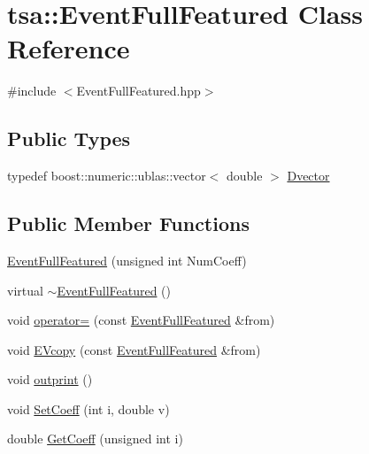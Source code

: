 \hypertarget{classtsa_1_1_event_full_featured}{}\section{tsa\+:\+:Event\+Full\+Featured Class Reference}
\label{classtsa_1_1_event_full_featured}


{\ttfamily \#include $<$Event\+Full\+Featured.\+hpp$>$}

\subsection*{Public Types}
\begin{DoxyCompactItemize}
\item 
typedef boost\+::numeric\+::ublas\+::vector$<$ double $>$ \hyperlink{classtsa_1_1_event_full_featured_a6488de4b125cea43e4528244e3300ace}{Dvector}
\end{DoxyCompactItemize}
\subsection*{Public Member Functions}
\begin{DoxyCompactItemize}
\item 
\hyperlink{classtsa_1_1_event_full_featured_a8bc28f8e2fcf53b5f82007e66fd7dcc7}{Event\+Full\+Featured} (unsigned int Num\+Coeff)
\item 
virtual \hyperlink{classtsa_1_1_event_full_featured_a388415f631c395f5400fba612dd64fb7}{$\sim$\+Event\+Full\+Featured} ()
\item 
void \hyperlink{classtsa_1_1_event_full_featured_af1e6685d67bfcb136997b1bf089a6daf}{operator=} (const \hyperlink{classtsa_1_1_event_full_featured}{Event\+Full\+Featured} \&from)
\item 
void \hyperlink{classtsa_1_1_event_full_featured_a6b9088ed7c7a397564879061dbec220c}{E\+Vcopy} (const \hyperlink{classtsa_1_1_event_full_featured}{Event\+Full\+Featured} \&from)
\item 
void \hyperlink{classtsa_1_1_event_full_featured_aeafc3b5782ce26ca5cb7e98ee5786f71}{outprint} ()
\item 
void \hyperlink{classtsa_1_1_event_full_featured_a36acadaf6ce17ac9dfe3d8cd2e13aa25}{Set\+Coeff} (int i, double v)
\item 
double \hyperlink{classtsa_1_1_event_full_featured_ac17118b2291d80c701a380cb82af7b66}{Get\+Coeff} (unsigned int i)
\end{DoxyCompactItemize}
